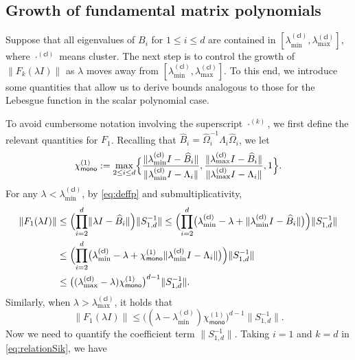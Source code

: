 \documentclass{article}
\newcommand{\defi}{:=}
\newcommand{\chim}{\chi_{\mathsf{mono}}}
\newcommand{\cl}{(\mathsf{cl})}
\newcommand{\fp}{F}
\providecommand{\norm}[1]{\lVert#1\rVert}
\begin{document}
\subsection{Growth of fundamental matrix polynomials}

Suppose that all eigenvalues of $B_{i}$ for $1\leq i\leq d$ are contained in $[\lambda_{\min}^{\cl},\lambda_{\max}^{\cl}]$, where $\cdot^{\cl}$ means cluster.
The next step is to control the growth of $\norm{\fp_{k}(\lambda I)}$ as $\lambda$ moves away from $[\lambda_{\min}^{\cl},\lambda_{\max}^{\cl}]$.
To this end, we introduce some quantities that allow us to derive bounds analogous to those for the Lebesgue function in the scalar polynomial case.

To avoid cumbersome notation involving the superscript $\cdot^{(k)}$, we first define the relevant quantities for $\fp_{1}$.
Recalling that $\widehat{B}_{i}=\widehat{\Omega}_{i}^{-1}\Lambda_{i}\widehat{\Omega}_{i}$, we let  
\begin{equation*}
    \chim^{(1)} \defi  \max_{2\leq i\leq d}\Bigl\{ \frac{\norm{\lambda_{\min}^{\cl}I-\widehat{B}_{i}}}{\norm{\lambda_{\min}^{\cl}I-\Lambda_{i}}},\frac{\norm{\lambda_{\max}^{\cl}I-\widehat{B}_{i}}}{\norm{\lambda_{\max}^{\cl}I-\Lambda_{i}}},1\Bigr\}.
\end{equation*}
For any $\lambda<\lambda_{\min}^{\cl}$, by \cref{eq:deffp} and submultiplicativity,
\begin{equation*}
    \begin{aligned}
    \norm{\fp_{1}(\lambda I)}&\leq \Bigl(\prod_{i=2}^{d}\norm{\lambda I-\widehat{B}_{i}}\Bigr) \norm{S_{1,d}^{-1}} \leq \Bigl(\prod_{i=2}^{d}\bigl(\lambda_{\min}^{\cl}-\lambda+\norm{\lambda_{\min}^{\cl} I-\widehat{B}_{i}}\bigr)\Bigr) \norm{S_{1,d}^{-1}}
    \\ &\leq \Bigl(\prod_{i=2}^{d}\bigl(\lambda_{\min}^{\cl}-\lambda+\chim^{(1)}\norm{\lambda_{\min}^{\cl} I-\Lambda_{i}}\bigr)\Bigr) \norm{S_{1,d}^{-1}}\\  
    &\leq \bigl((\lambda_{\max}^{\cl}-\lambda)\chim^{(1)}\bigr)^{d-1}\norm{S_{1,d}^{-1}}.
    \end{aligned}
\end{equation*}
Similarly, when $\lambda>\lambda_{\max}^{\cl}$, it holds that 
\begin{equation*}
    \norm{\fp_{1}(\lambda I)}\leq \bigl((\lambda-\lambda_{\min}^{\cl})\chim^{(1)}\bigr)^{d-1}\norm{S_{1,d}^{-1}}.
\end{equation*}
Now we need to quantify the coefficient term $\norm{S_{1,d}^{-1}}$. Taking $i=1$ and $k=d$ in \cref{eq:relationSik}, we have  
\end{document}
